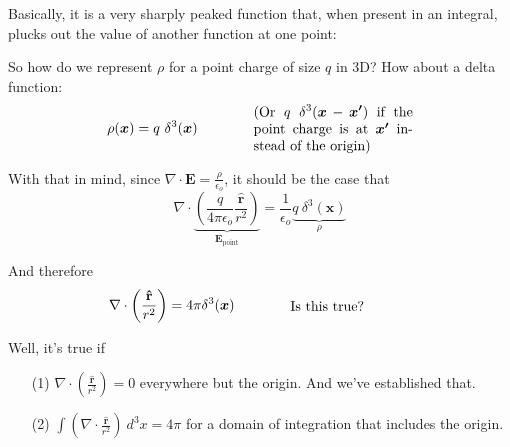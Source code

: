 \documentclass{article}
\numberwithin{equation}{section}
\newcommand{\rhat}{\mathbf{\hat{r}}}
\begin{document}
Basically, it is a very sharply peaked function that, when present in an integral, plucks out the value of another function at one point:

\begin{figure}[H]
\centering
{}
\label{fig:3:delta}
\end{figure}

So how do we represent $\rho$ for a point charge of size $q$ in 3D? How about a delta function:
\begin{equation*}
    \rho(\bm{x}) = q\ \delta^3(\bm{x}) \qquad\qquad \parbox[c]{0.33\textwidth}{(Or $\displaystyle q\ \delta^3(\bm{x} - \bm{x'})$ if the point charge is at $\bm{x'}$ instead of the origin)}
\end{equation*}

With that in mind, since $\displaystyle \nabla \cdot \bm{E} = \frac{\rho}{\epsilon_o}$, it should be the case that
\begin{equation*}
    \nabla \cdot \underbrace{\left( \frac{q}{4\pi\epsilon_o} \frac{\rhat}{r^2} \right)}_{\displaystyle \bm{E}_{\text{point}}} = \frac{1}{\epsilon_o} \underbrace{q\ \delta^3(\bm{x})}_{\displaystyle \rho}
\end{equation*}

And therefore
\begin{equation*}
    \nabla \cdot \left( \frac{\rhat}{r^2} \right) = 4\pi\delta^3(\bm{x}) \qquad\qquad \parbox[c]{0.25\textwidth}{Is this true?}
\end{equation*}

Well, it's true if
\begin{enumerate}

\item[(1)] $\displaystyle \nabla \cdot \left( \frac{\rhat}{r^2} \right) = 0$ everywhere but the origin. And we've established that.

\item[(2)] $\displaystyle \int \left( \nabla \cdot \frac{\rhat}{r^2} \right)\ d^3x = 4\pi$ for a domain of integration that includes the origin.

\end{enumerate}
\end{document}
